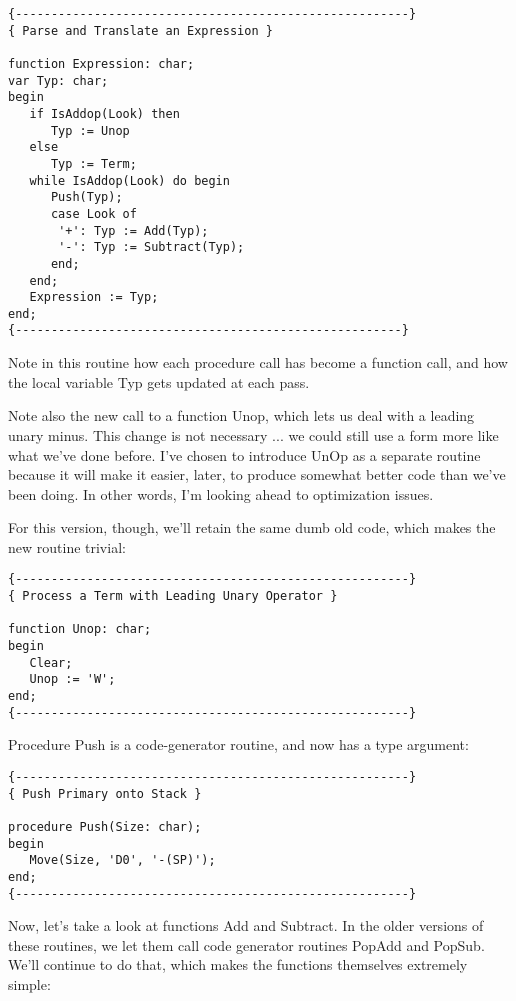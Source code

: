 \begin{verbatim}
{-------------------------------------------------------}
{ Parse and Translate an Expression }

function Expression: char;
var Typ: char;
begin
   if IsAddop(Look) then
      Typ := Unop
   else
      Typ := Term;
   while IsAddop(Look) do begin
      Push(Typ);
      case Look of
       '+': Typ := Add(Typ);
       '-': Typ := Subtract(Typ);
      end;
   end;
   Expression := Typ;
end;
{------------------------------------------------------}
\end{verbatim}

Note  in  this  routine how each  procedure  call  has  become  a function call, and how  the  local  variable  Typ gets updated at each pass.

Note also the new call to a function  Unop, which  lets  us deal with a leading unary minus. This change is not necessary  ... we could  still  use  a form more like what we've done before. I've chosen  to  introduce  UnOp as a separate routine because it will make it easier, later, to produce somewhat better code than we've been  doing. In other words, I'm looking ahead to optimization issues.

For  this  version, though, we'll retain the same dumb old code, which makes the new routine trivial:

\begin{verbatim}
{-------------------------------------------------------}
{ Process a Term with Leading Unary Operator }

function Unop: char;
begin
   Clear;
   Unop := 'W';
end;
{-------------------------------------------------------}
\end{verbatim}

Procedure  Push  is  a code-generator routine, and now has a type argument:

\begin{verbatim}
{-------------------------------------------------------}
{ Push Primary onto Stack }

procedure Push(Size: char);
begin
   Move(Size, 'D0', '-(SP)');
end;
{-------------------------------------------------------}
\end{verbatim}

Now, let's take a look at functions Add  and  Subtract. In the older versions of these routines, we let them call code generator routines PopAdd and PopSub. We'll  continue  to do that, which makes the functions themselves extremely simple:

